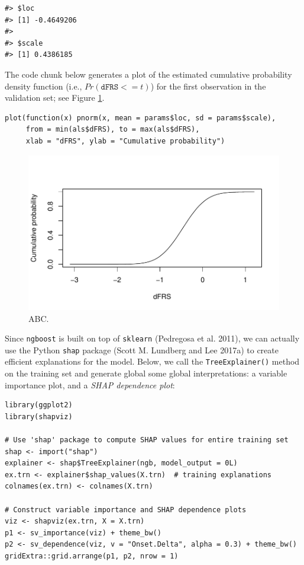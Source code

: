 \begin{verbatim}
#> $loc
#> [1] -0.4649206
#> 
#> $scale
#> [1] 0.4386185
\end{verbatim}

The code chunk below generates a plot of the estimated cumulative probability density function (i.e., \(Pr\left(\texttt{dFRS} <= t\right)\)) for the first observation in the validation set; see Figure \ref{fig:als-ngb-normal}.

\begin{verbatim}
plot(function(x) pnorm(x, mean = params$loc, sd = params$scale), 
     from = min(als$dFRS), to = max(als$dFRS),
     xlab = "dFRS", ylab = "Cumulative probability")
\end{verbatim}

\begin{figure}
\includegraphics[width=1\linewidth]{greenwell_files/figure-latex/als-ngb-normal-1} \caption{ABC.}\label{fig:als-ngb-normal}
\end{figure}

Since \texttt{ngboost} is built on top of \texttt{sklearn} (Pedregosa et al. 2011), we can actually use the Python \texttt{shap} package (Scott M. Lundberg and Lee 2017a) to create efficient explanations for the model. Below, we call the \texttt{TreeExplainer()} method on the training set and generate global some global interpretations: a variable importance plot, and a \emph{SHAP dependence plot}:

\begin{verbatim}
library(ggplot2)
library(shapviz)

# Use 'shap' package to compute SHAP values for entire training set
shap <- import("shap")
explainer <- shap$TreeExplainer(ngb, model_output = 0L)
ex.trn <- explainer$shap_values(X.trn)  # training explanations
colnames(ex.trn) <- colnames(X.trn)

# Construct variable importance and SHAP dependence plots
viz <- shapviz(ex.trn, X = X.trn)
p1 <- sv_importance(viz) + theme_bw()
p2 <- sv_dependence(viz, v = "Onset.Delta", alpha = 0.3) + theme_bw()
gridExtra::grid.arrange(p1, p2, nrow = 1)
\end{verbatim}

